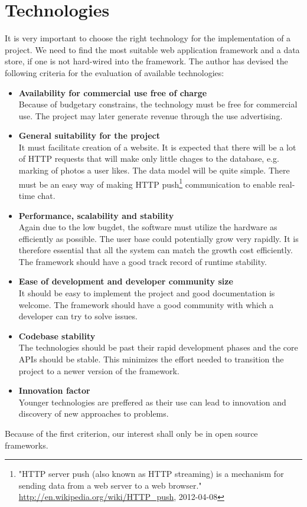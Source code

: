 \documentclass[12pt,oneside]{fithesis}
\begin{document}
\section{Technologies}
	It is very important to choose the right technology for the implementation of a project. We need to find the most suitable web application framework and a data store, if one is not hard-wired into the framework. The author has devised the following criteria for the evaluation of available technologies:
	\begin{itemize}
		\item \textbf{Availability for commercial use free of charge}\\
			Because of budgetary constrains, the technology must be free for commercial use. The project may later generate revenue through the use advertising.
		\item \textbf{General suitability for the project}\\
			It must facilitate creation of a website. It is expected that there will be a lot of HTTP requests that will make only little chages to the database, e.g. marking of photos a user likes. The data model will be quite simple. There must be an easy way of making HTTP push\footnote{"HTTP server push (also known as HTTP streaming) is a mechanism for sending data from a web server to a web browser." \url{http://en.wikipedia.org/wiki/HTTP_push}, {2012-04-08}} communication to enable real-time chat. 
		\item \textbf{Performance, scalability and stability}\\
			Again due to the low bugdet, the software must utilize the hardware as efficiently as possible. The user base could potentially grow very rapidly. It is therefore essential that all the system can match the growth cost efficiently. The framework should have a good track record of runtime stability.
		\item \textbf{Ease of development and developer community size}\\
			It should be easy to implement the project and good documentation is welcome. The framework should have a good community with which a developer can try to solve issues.
		\item \textbf{Codebase stability}\\
			The technologies should be past their rapid development phases and the core APIs should be stable. This minimizes the effort needed to transition the project to a newer version of the framework. 
		\item \textbf{Innovation factor}\\
			Younger technologies are preffered as their use can lead to innovation and discovery of new approaches to problems.
	\end{itemize}
	Because of the first criterion, our interest shall only be in open source frameworks.
\end{document}
